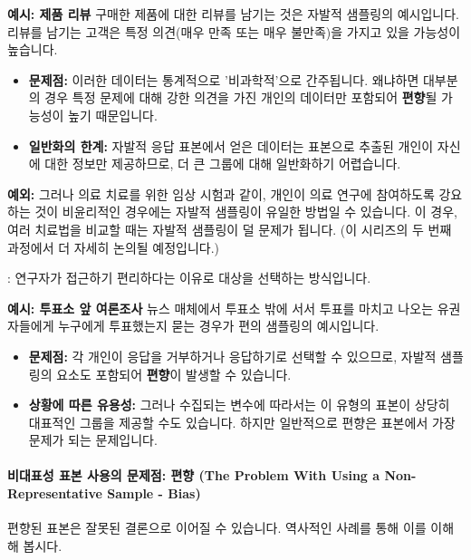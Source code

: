 \documentclass[11pt,a4paper]{article}
\begin{document}
\begin{examplebox}
\textbf{예시: 제품 리뷰}
구매한 제품에 대한 리뷰를 남기는 것은 자발적 샘플링의 예시입니다. 리뷰를 남기는 고객은 특정 의견(매우 만족 또는 매우 불만족)을 가지고 있을 가능성이 높습니다.
\begin{itemize}
    \item \textbf{문제점:} 이러한 데이터는 통계적으로 '비과학적'으로 간주됩니다. 왜냐하면 대부분의 경우 특정 문제에 대해 강한 의견을 가진 개인의 데이터만 포함되어 \textbf{편향}될 가능성이 높기 때문입니다.
    \item \textbf{일반화의 한계:} 자발적 응답 표본에서 얻은 데이터는 표본으로 추출된 개인이 자신에 대한 정보만 제공하므로, 더 큰 그룹에 대해 일반화하기 어렵습니다.
\end{itemize}
\textbf{예외:} 그러나 의료 치료를 위한 임상 시험과 같이, 개인이 의료 연구에 참여하도록 강요하는 것이 비윤리적인 경우에는 자발적 샘플링이 유일한 방법일 수 있습니다. 이 경우, 여러 치료법을 비교할 때는 자발적 샘플링이 덜 문제가 됩니다. (이 시리즈의 두 번째 과정에서 더 자세히 논의될 예정입니다.)
\end{examplebox}

\begin{tcolorbox}[mybox, title={비확률 방법 (2/2): 편의 샘플링 (Convenience Sampling)}]
: 연구자가 접근하기 편리하다는 이유로 대상을 선택하는 방식입니다.
\end{tcolorbox}

\begin{examplebox}
\textbf{예시: 투표소 앞 여론조사}
뉴스 매체에서 투표소 밖에 서서 투표를 마치고 나오는 유권자들에게 누구에게 투표했는지 묻는 경우가 편의 샘플링의 예시입니다.
\begin{itemize}
    \item \textbf{문제점:} 각 개인이 응답을 거부하거나 응답하기로 선택할 수 있으므로, 자발적 샘플링의 요소도 포함되어 \textbf{편향}이 발생할 수 있습니다.
    \item \textbf{상황에 따른 유용성:} 그러나 수집되는 변수에 따라서는 이 유형의 표본이 상당히 대표적인 그룹을 제공할 수도 있습니다. 하지만 일반적으로 편향은 표본에서 가장 문제가 되는 문제입니다.
\end{itemize}
\end{examplebox}

\paragraph{비대표성 표본 사용의 문제점: 편향 (The Problem With Using a Non-Representative Sample - Bias)}
편향된 표본은 잘못된 결론으로 이어질 수 있습니다. 역사적인 사례를 통해 이를 이해해 봅시다.
\end{document}

